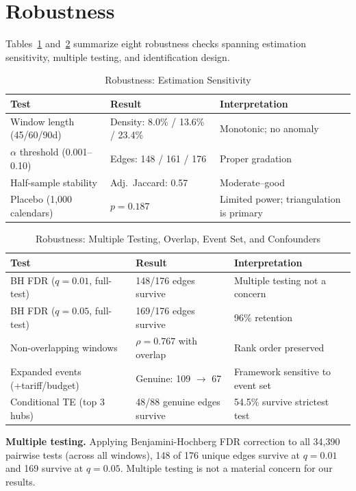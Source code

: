 \documentclass[12pt,letterpaper]{article}
\begin{document}
\section{Robustness}\label{sec:robustness}

Tables~\ref{tab:robustness} and~\ref{tab:robustness2} summarize eight robustness checks spanning estimation sensitivity, multiple testing, and identification design.

\begin{table}[H]
\centering
\caption{Robustness: Estimation Sensitivity}\label{tab:robustness}
\begin{tabular}{lll}
\toprule
Test & Result & Interpretation \\
\midrule
Window length (45/60/90d) & Density: 8.0\% / 13.6\% / 23.4\% & Monotonic; no anomaly \\
$\alpha$ threshold (0.001--0.10) & Edges: 148 / 161 / 176 & Proper gradation \\
Half-sample stability & Adj.\ Jaccard: 0.57 & Moderate--good \\
Placebo (1,000 calendars) & $p = 0.187$ & Limited power; triangulation is primary \\
\bottomrule
\end{tabular}
\end{table}

\begin{table}[H]
\centering
\caption{Robustness: Multiple Testing, Overlap, Event Set, and Confounders}\label{tab:robustness2}
\begin{tabular}{lll}
\toprule
Test & Result & Interpretation \\
\midrule
BH FDR ($q=0.01$, full-test) & 148/176 edges survive & Multiple testing not a concern \\
BH FDR ($q=0.05$, full-test) & 169/176 edges survive & 96\% retention \\
Non-overlapping windows & $\rho = 0.767$ with overlap & Rank order preserved \\
Expanded events (+tariff/budget) & Genuine: 109 $\to$ 67 & Framework sensitive to event set \\
Conditional TE (top 3 hubs) & 48/88 genuine edges survive & 54.5\% survive strictest test \\
\bottomrule
\end{tabular}
\end{table}

\textbf{Multiple testing.} Applying Benjamini-Hochberg FDR correction to all 34,390 pairwise tests (across all windows), 148 of 176 unique edges survive at $q = 0.01$ and 169 survive at $q = 0.05$. Multiple testing is not a material concern for our results.
\end{document}
